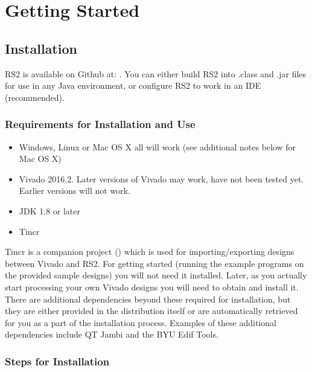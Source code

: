 \documentclass[10pt]{article}
\begin{document}
\pagebreak
\section{Getting Started}

\subsection{Installation}

RS2 is available on Github at:
{}.
You can either build RS2 into .class and .jar files for use in any Java
environment, or configure RS2 to work in an IDE (recommended).

\subsubsection{Requirements for Installation and Use}
\begin{itemize}
  \item Windows, Linux or Mac OS X all will work (see additional notes below for
  Mac OS X)
  \item Vivado 2016.2. Later versions of Vivado may work, have not been tested
  yet. Earlier versions will not work.
  \item JDK 1.8 or later
  \item Tincr 
\end{itemize}

Tincr is a companion project
({}) which is used for
importing/exporting designs between Vivado and RS2.  For getting started (running the example programs on the provided sample designs) you will not need it installed.
Later, as you  actually start processing your own Vivado designs you will need
to obtain and install it. There are additional dependencies beyond these
required for installation, but they are either provided in the distribution
itself or are automatically retrieved for you as a part of the installation process. 
Examples of these additional dependencies include QT Jambi and the BYU Edif
Tools.
 
\subsubsection{Steps for Installation}
\end{document}
